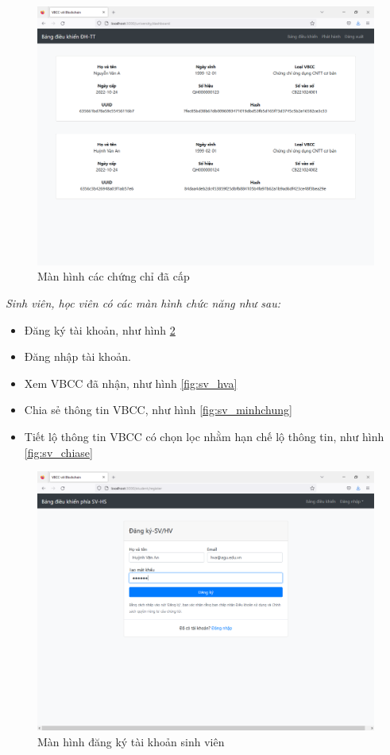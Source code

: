 \begin{figure}[htbp]
\centering
\includegraphics[width=.9\linewidth]{img/tt_dacap.PNG}
\caption{Màn hình các chứng chỉ đã cấp}
\label{fig:tt_dacap}
\end{figure}


\emph{Sinh viên, học viên có các màn hình chức năng như sau:}

\begin{itemize}
\item Đăng ký tài khoản, như hình \ref{fig:std_new}
\item Đăng nhập tài khoản.
\item Xem VBCC đã nhận, như hình \ref{fig:sv_hva}
\item Chia sẻ thông tin VBCC, như hình \ref{fig:sv_minhchung}
\item Tiết lộ thông tin VBCC có chọn lọc nhằm hạn chế lộ thông tin, như hình \ref{fig:sv_chiase}
\end{itemize}

\begin{figure}[htbp]
\centering
\includegraphics[width=.9\linewidth]{img/std_new.PNG}
\caption{Màn hình đăng ký tài khoản sinh viên}
\label{fig:std_new}
\end{figure}


